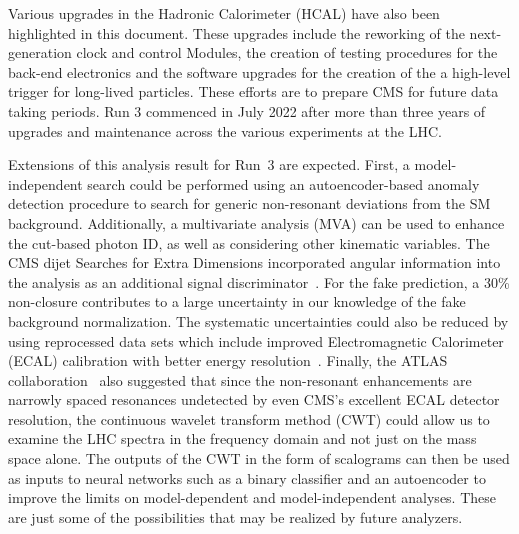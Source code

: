 
Various upgrades in the Hadronic Calorimeter (HCAL) have also been highlighted in this document. These upgrades include the reworking of the next-generation clock and control Modules, the creation of testing procedures for the back-end electronics and the software upgrades for the creation of the a high-level trigger for long-lived particles. These efforts are to prepare CMS for future data taking periods. Run 3 commenced in July 2022 after more than three years of upgrades and maintenance across the various experiments at the LHC. 

Extensions of this analysis result for Run~3 are expected. First, a model-independent search could be performed using an autoencoder-based anomaly detection procedure to search for generic non-resonant deviations from the SM background. Additionally, a multivariate analysis (MVA) can be used to enhance the cut-based photon ID, as well as considering other kinematic variables. The CMS dijet Searches for Extra Dimensions incorporated angular information into the analysis as an additional signal discriminator~\cite{CMS:2018mgb}. For the fake prediction, a 30\% non-closure contributes to a large uncertainty in our knowledge of the fake background normalization. The systematic uncertainties could also be reduced by using reprocessed data sets which include improved Electromagnetic Calorimeter (ECAL) calibration with better energy resolution~\cite{Cavallari:2020ydz}. Finally, the ATLAS collaboration~\cite{ATLAS:2023hbp} also suggested that since the non-resonant enhancements are narrowly spaced resonances undetected by even CMS's excellent ECAL detector resolution, the continuous wavelet transform method (CWT) could allow us to examine the LHC spectra in the frequency domain and not just on the mass space alone. The outputs of the CWT in the form of scalograms can then be used as inputs to neural networks such as a binary classifier and an autoencoder to improve the limits on model-dependent and model-independent analyses. These are just some of the possibilities that may be realized by future analyzers.



